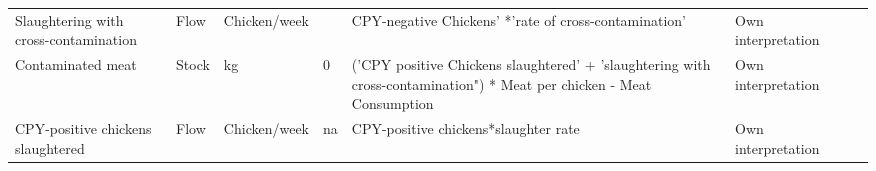 \begin{landscape}
\begin{longtable}[c]{m{10em}lllm{15em}lll}
Slaughtering with cross-contamination         & Flow     & Chicken/week             &                           & CPY-negative Chickens' *'rate of cross-contamination'                                                                                                                                                                                                                                    & Own interpretation                                                                                                                                                                           &                                                                                                                                                                                                                                       \\
Contaminated meat                             & Stock    & kg                       & 0                         & ('CPY positive Chickens slaughtered' + 'slaughtering with cross-contamination") * Meat per chicken  - Meat Consumption                                                                                                                                                                   & Own interpretation                                                                                                                                                                           &                                                                                                                                                                                                                                       \\
CPY-positive chickens slaughtered             & Flow     & Chicken/week             & na                        & CPY-positive chickens*slaughter rate                                                                                                                                                                                                                                                     & Own interpretation                                                                                                                                                                           &                                                                                                                                                                                                                                       \\

\end{longtable}
\end{landscape}
